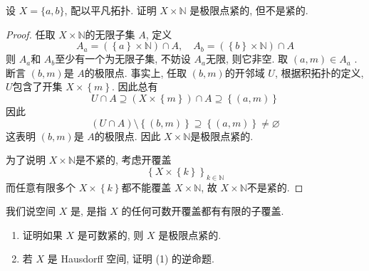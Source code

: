 \documentclass[../main.tex]{subfiles}
\begin{document}
\begin{exercise}{}{}
设 $X = \{a, b\}$, 配以平凡拓扑. 证明 $X \times \mathbb{N}$ 是极限点紧的, 但不是紧的.
\end{exercise}
\begin{proof}
    任取 \(  X\times \mathbb{N}   \)的无限子集 \(  A  \), 定义 \[
    A_{a}= \left( \left\{ a \right\}\times \mathbb{N}  \right)\cap A ,\quad A_{b}= \left( \left\{ b \right\}\times \mathbb{N}  \right)\cap A 
    \]  则 \(  A_{a}  \)和 \(  A_{b}  \)至少有一个为无限子集, 不妨设 \(  A_{a}  \)无限, 则它非空. 取 \(  \left( a,m \right)\in A_{a}   \)   . 断言 \(  \left( b,m \right)   \)是 \(  A  \)的极限点. 事实上, 任取 \(  \left( b,m \right)   \)的开邻域 \(  U  \), 根据积拓扑的定义, \(  U  \)包含了开集 \(  X\times \left\{ m \right\}  \). 因此总有 \[
    U\cap A\supseteq \left( X\times \left\{ m \right\} \right)\cap A\supseteq \left\{ \left( a,m \right)  \right\}
    \]      因此 \[
    \left( U\cap A \right)\setminus \left\{ \left( b,m \right)  \right\}\supseteq \left\{ \left( a,m \right)  \right\}\neq \varnothing 
    \]这表明 \(  \left( b,m \right)   \)是 \(  A  \)的极限点.   因此 \(  X\times \mathbb{N}   \)是极限点紧的.
    
    为了说明 \(  X\times \mathbb{N}   \)是不紧的, 考虑开覆盖 \[
    \left\{ X\times \left\{ k \right\} \right\}_{k \in \mathbb{N} }
    \] 而任意有限多个 \(  X\times \left\{ k \right\}  \)都不能覆盖 \(  X\times \mathbb{N}   \), 故 \(  X\times \mathbb{N}   \)不是紧的.   
\end{proof}
\begin{exercise}{}{}
我们说空间 $X$ 是, 是指 $X$ 的任何可数开覆盖都有有限的子覆盖.
\begin{enumerate}
\item 证明如果 $X$ 是可数紧的, 则 $X$ 是极限点紧的.
\item 若 $X$ 是 Hausdorff 空间, 证明 (1) 的逆命题.
\end{enumerate}
\end{exercise}
\end{document}
